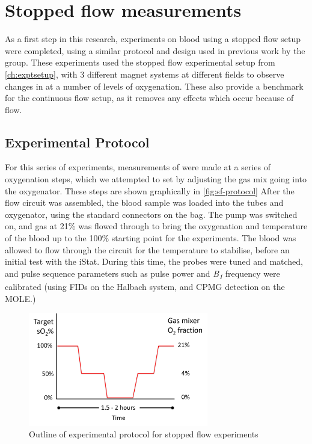\chapter{Stopped flow \SOtwo measurements}\label{ch:stoppedflow}

As a first step in this research, experiments on blood using a stopped flow setup were completed, using a similar protocol and design used in previous work by the group.
These experiments used the stopped flow experimental setup from \autoref{ch:exptsetup}, with 3 different magnet systems at different fields to observe changes in \Ttwo at a number of levels of oxygenation.
These also provide a benchmark for the continuous flow setup, as it removes any effects which occur because of flow.

\section{Experimental Protocol}
For this series of experiments, measurements of \Ttwo were made at a series of oxygenation steps, which we attempted to set by adjusting the gas mix going into the oxygenator.
These steps are shown graphically in \autoref{fig:sf-protocol}
After the flow circuit was assembled, the blood sample was loaded into the tubes and oxygenator, using the standard connectors on the bag.
The pump was switched on, and gas at 21\% \Otwo was flowed through to bring the oxygenation and temperature of the blood up to the 100\% starting point for the experiments.
The blood was allowed to flow through the circuit for the temperature to stabilise, before an initial test with the iStat.
During this time, the probes were tuned and matched, and pulse sequence parameters such as pulse power and \textit{B\textsubscript{1}} frequency were calibrated (using FIDs on the Halbach system, and CPMG detection on the MOLE.)
\begin{figure}[t]
\centering
\includegraphics[width=0.7\textwidth]{figures/stoppedflow/stoppedflowprotocol.png}
\caption{Outline of experimental protocol for stopped flow experiments}
\label{fig:sf-protocol}
\end{figure}

